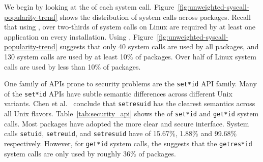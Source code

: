 We begin by looking at the \unwusagemetric{} of each system call. Figure~\ref{fig:unweighted-syscall-popularity-trend} shows the 
distribution of system calls across packages. 
Recall that using \usagemetric{},
over two-thirds of system calls on Linux are required by 
at least one application on every installation.
Using \unwusagemetric{},
Figure~\ref{fig:unweighted-syscall-popularity-trend} suggests that only 40 system calls are used by all packages,
and 130 system calls
are used by at least 10\% of packages.
Over half of Linux system calls are used by less than 10\% of packages.  


One family of APIs prone to security problems are the %
{\tt set*id} API family.
Many of the {\tt set*id} APIs
have subtle semantic differences across different Unix variants.
Chen et al.~\citep{chen02setuid} conclude that 
{\tt setresuid} has the clearest semantics 
across all Unix flavors. 
Table~\ref{tab:security_api} shows the \unwusagemetric{} 
of {\tt set*id} and {\tt get*id} system calls.
Most packages have 
adopted the more clear and secure interface. 
System calls {\tt setuid}, {\tt setreuid}, and {\tt setresuid} have
\unwusagemetric{} of 15.67\%, 1.88\% and 99.68\% respectively. 
However, for {\tt get*id} system calls, the \unwusagemetric{} suggests that the {\tt getres*id}
system calls %
are only used by roughly 36\% of packages.


